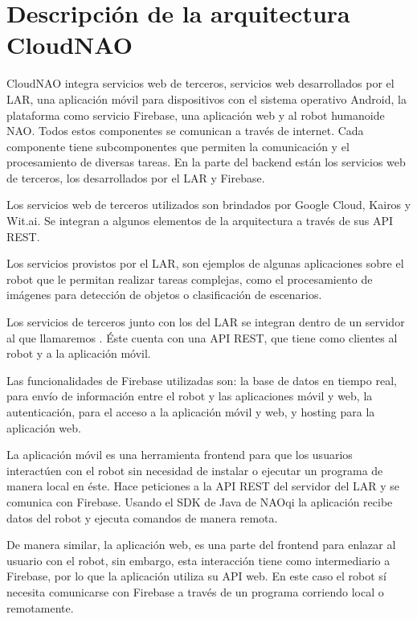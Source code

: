 \section{Descripción de la arquitectura CloudNAO}
\label{\detokenize{chapter_two/desc_cloudnao:descripcion-de-la-arquitectura-cloudnao}}\label{\detokenize{chapter_two/desc_cloudnao::doc}}
CloudNAO integra servicios web de
terceros, servicios web desarrollados por el LAR, una aplicación móvil para
dispositivos con el sistema operativo Android, la plataforma como servicio
Firebase, una aplicación web y al robot humanoide NAO. Todos estos componentes
se comunican a través de internet. Cada componente tiene subcomponentes que
permiten la comunicación y el procesamiento de diversas tareas. En la parte del
backend están los servicios web de terceros, los desarrollados
por el LAR y Firebase. 

Los servicios web de terceros utilizados son brindados por Google Cloud,
Kairos y Wit.ai. Se integran a algunos elementos de la arquitectura a través
de sus API REST.

Los servicios provistos por el LAR, son ejemplos de algunas aplicaciones sobre el
robot que le permitan realizar tareas complejas, como el procesamiento
de imágenes para detección de objetos o clasificación de escenarios.

Los servicios de terceros junto con los del LAR se integran dentro de un servidor al
que llamaremos . Éste cuenta
con una API REST, que tiene como clientes al robot y a la aplicación móvil.

Las funcionalidades de Firebase utilizadas son: la base de datos en tiempo real,
para envío de información entre el robot y las aplicaciones móvil y web,
la autenticación, para el acceso a la aplicación móvil y web, y hosting para
la aplicación web.

La aplicación móvil es una herramienta frontend para que los usuarios
interactúen con el robot sin necesidad de instalar o ejecutar un programa de
manera local en éste. Hace peticiones a la API REST del servidor del LAR y
se comunica con Firebase. Usando el SDK de Java de NAOqi la
aplicación recibe datos del robot y ejecuta comandos de manera remota.

De manera similar, la aplicación web, es una parte del frontend para enlazar
al usuario con el robot, sin embargo, esta interacción tiene como intermediario
a Firebase, por lo que la aplicación utiliza su API web. En este caso el robot
sí necesita comunicarse con Firebase a través de un programa corriendo local
o remotamente.


